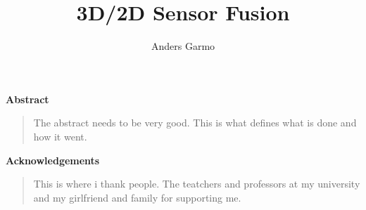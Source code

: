 \documentclass[twoside, a4paper]{book}
\title{3D/2D Sensor Fusion}
\author{Anders Garmo}
\newenvironment{acknowledgements}
{\pagestyle{empty}
\begin{center}
\vspace*{1.5cm}
{\Large \bfseries Acknowledgements}
\end{center}
\vspace{0.5cm}
\begin{quote}}
{\end{quote}}
\newenvironment{abstracts} { \pagestyle{empty}
  \begin{center}
  \vspace*{1.5cm}
  {\Large \bfseries  Abstract}
  \end{center}
  \vspace{0.5cm}
   \begin{quote}}
{\end{quote}}
\begin{document}

\maketitle  %



\begin{abstracts}
    The abstract needs to be very good. This is what defines what is done and how it went.
\end{abstracts}

\frontmatter

\begin{acknowledgements}
    This is where i thank people. The teatchers and professors at my university and my
    girlfriend and family for supporting me.
\end{acknowledgements}




\setcounter{secnumdepth}{3} %
\setcounter{tocdepth}{3}    %
\tableofcontents            %










\begin{multicols}{2} %
\begin{footnotesize} %

\printnomenclature[1.5cm] %
\label{nom} %

\end{footnotesize}
\end{multicols}
\end{document}
